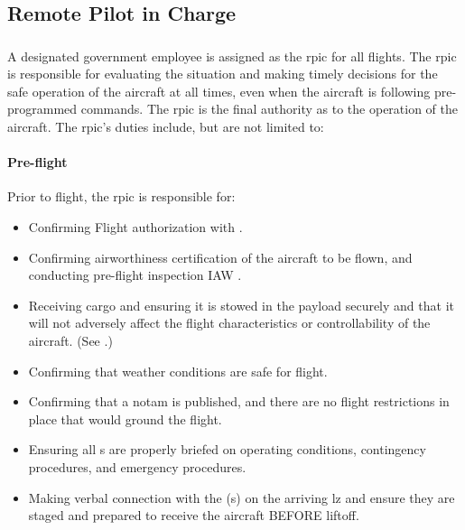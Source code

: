         \subsection{Remote Pilot in Charge}\label{role:rpic}

            \subsubsection{}A designated government employee is assigned as the \ac{rpic} for all flights. The \ac{rpic} is responsible for evaluating the situation and making timely decisions for the safe operation of the \projectmars{} aircraft at all times, even when the aircraft is following pre-programmed commands. The \ac{rpic} is the final authority as to the operation of the aircraft. The \ac{rpic}'s duties include, but are not limited to:

                \paragraph{Pre-flight} Prior to flight, the \ac{rpic} is responsible for: 
                
                \begin{itemize}
                
                    \item Confirming Flight authorization with . 

                    \item Confirming airworthiness certification of the aircraft to be flown, and conducting pre-flight inspection IAW .

                    \item Receiving cargo and ensuring it is stowed in the payload securely and that it will not adversely affect the flight characteristics or controllability of the aircraft. (See .)

                    \item Confirming that weather conditions are safe for flight.

                    \item Confirming that a \ac{notam} is published, and there are no flight restrictions in place that would ground the flight.

                    \item Ensuring all s are properly briefed on operating conditions, contingency procedures, and emergency procedures.

                    \item Making verbal connection with the (s) on the arriving \ac{lz} and ensure they are staged and prepared to receive the aircraft BEFORE liftoff.
                    
                \end{itemize}

